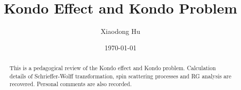 \documentclass[10pt,nofootinbib]{revtex4}
\begin{document}
\title{Kondo Effect and Kondo Problem}%

\author{Xiaodong Hu}

\date{\today}


\begin{abstract}
	This is a pedagogical review of the Kondo effect and Kondo problem. Calculation details of Schrieffer-Wolff transformation, spin scattering processes and RG analysis are recovered. Personal comments are also recorded.
\end{abstract}
\maketitle
\tableofcontents
\end{document}
